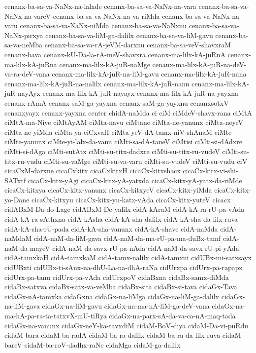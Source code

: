 {cenanx-ba-sa-va-NaNx-na-lalxde
cenanx-ba-sa-va-NaNx-na-vara
cenanx-ba-sa-va-NaNx-na-vareV
cenanx-ba-sa-va-NaNx-na-va-riMda
cenanx-ba-sa-va-NaNx-na-varu
cenanx-ba-sa-va-NaNx-niMda
cenanx-ba-sa-va-NaNxnu
cenanx-ba-sa-va-NaNx-pirxya
cenanx-ba-sa-va-liM-ga-dalilx
cenanx-ba-sa-va-liM-gavu
cenanx-ba-sa-va-neMba
cenanx-ba-sa-va-rA-jeVM-darxnu
cenanx-ba-sa-veV-shavxraM
cenanx-bava
cenanx-kU-Da-la-rA-meV-shavxra
cenanx-ma-lilx-kA-juRnA
cenanx-ma-lilx-kA-juRna
cenanx-ma-lilx-kA-juR-naMge
cenanx-ma-lilx-kA-juR-na-deV-va-ra-deV-vana
cenanx-ma-lilx-kA-juR-na-liM-gavu
cenanx-ma-lilx-kA-juR-nana
cenanx-ma-lilx-kA-juR-na-nalilx
cenanx-ma-lilx-kA-juR-nanu
cenanx-ma-lilx-kA-juR-nayAyx
cenanx-ma-lilx-kA-juR-nayayx
cenanx-ma-lilx-kA-juR-na-yayxna
cenanx-rAmA
cenanx-saM-ga-yayxna
cenanx-saM-ga-yayxnu
cenanxsotxV
cenanxyayx
cenanx-yayxna
center
chidA-naMda
ci
ciM
ciMdeV-shavx-rana
ciMtA
ciMtA-ma-Niye
ciMtAyAM
ciMta-navu
ciMtane
ciMta-ne-yanunx
ciMta-neyeV
ciMta-ne-yiMda
ciMta-ya-ciCxvaH
ciMta-yeV-dA-tamx-niV-shAnaM
ciMte
ciMte-yanunx
ciMte-yi-lalx-da-vanu
ciMti-sa-dA-taneV
ciMtisi
ciMti-si-dAdxre
ciMti-si-dAga
ciMti-sutAtx
ciMti-su-titx-dadxre
ciMti-su-titx-ru-vudeV
ciMti-su-titx-ru-vudu
ciMti-su-vaMge
ciMti-su-va-varu
ciMti-su-vudeV
ciMti-su-vudu
ciV
cicaCxM-darxne
cicaCxkitx
cicaCxkitxH
cicaCx-kitxshacx
cicaCx-kitx-vi-shi-SATxtf
cicaCx-kitx-yAgi
cicaCx-kitx-yA-yatxda
cicaCx-kitx-yA-yatx-da-riMde
cicaCx-kitxya
cicaCx-kitx-yanunx
cicaCx-kitxyeV
cicaCx-kitx-yiMda
cicaCx-kitx-yo-Dane
cicaCx-kitxyu
cicaCx-kitx-yu-katx-vAda
cicaCx-kitx-yuteV
cicacx
cidABxM-Da-do-Lage
cidABxM-De-yalilx
cidA-kAraM
cidA-kA-ra-rU-pa-vAda
cidA-kA-ra-sAthxna
cidA-kAsha
cidA-kA-sha-dalilx
cidA-kA-sha-da-lilx-ruva
cidA-kA-sha-rU-pada
cidA-kA-sha-vanunx
cidA-kA-shave
cidA-naMda
cidA-naMdaM
cidA-naM-da-liM-gava
cidA-naM-da-ma-rU-pa-ma-duBx-tamf
cidA-naM-da-mayeV
cidA-naM-da-savx-rU-pa-nAda
cidA-naM-da-savx-rU-pi-yAda
cidA-tamxkaH
cidA-tamxkaM
cidA-tamx-nalilx
cidA-tamxni
cidUBx-mi-satxsayx
cidUBxti
cidUBx-ti-sAnx-na-dhU-La-na-dhA-raNa
cidUrxpa
cidUrx-pa-rapapx
cidUrx-pa-tanu
cidUrx-pa-vAda
cidUrxpoV
cidaBxna
cidaBx-samx-diMda
cidaBx-satxva
cidaBx-satx-va-veMba
cidaBx-sita
cidaBx-si-tava
cidaGx-Tava
cidaGx-nA-tamxka
cidaGxna
cidaGx-na-liMga
cidaGx-na-liM-ga-dalilx
cidaGx-na-liM-gava
cidaGx-na-liM-gavu
cidaGx-na-ma-hA-liM-ga-deV-vana
cidaGx-na-ma-hA-pa-ra-ta-tatxvX-mU-tiRya
cidaGx-na-parx-sA-da-va-ca-nA-maq-tada
cidaGx-na-vanunx
cidaGx-neY-ka-tavxdiM
cidaM-BoV-diya
cidaM-Da-vi-puRdu
cidaM-bara
cidaM-ba-radA
cidaM-ba-ra-dalilx
cidaM-ba-ra-da-lilx-ruva
cidaM-bareV
cidaM-ba-roV-dadhx-raNe
cidaMga
cidaM-ga-dalilx
}
